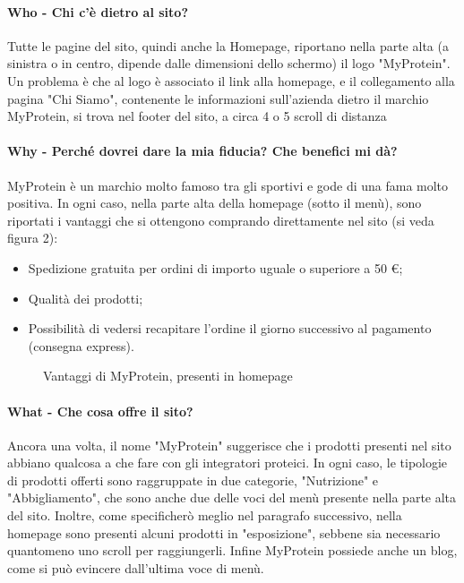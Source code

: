 \paragraph{Who - Chi c'è dietro al sito?}
Tutte le pagine del sito, quindi anche la Homepage, riportano nella parte alta (a sinistra o in centro, dipende dalle dimensioni dello schermo) il logo "MyProtein". Un problema è che al logo è associato il link alla homepage, e il collegamento alla pagina "Chi Siamo", contenente le informazioni sull'azienda dietro il marchio MyProtein, si trova nel footer del sito, a circa 4 o 5 scroll di distanza

\paragraph{Why - Perché dovrei dare la mia fiducia? Che benefici mi dà?}
MyProtein è un marchio molto famoso tra gli sportivi e gode di una fama molto positiva. In ogni caso, nella parte alta della homepage (sotto il menù), sono riportati i vantaggi che si ottengono comprando direttamente nel sito (si veda figura 2):
\begin{itemize}
	\item Spedizione gratuita per ordini di importo uguale o superiore a 50 \euro;
	\item Qualità dei prodotti;
	\item Possibilità di vedersi recapitare l'ordine il giorno successivo al pagamento (consegna express).
\end{itemize}
\begin{figure}[!htb]
	\caption{\label{fig:figura2} Vantaggi di MyProtein, presenti in homepage}
\end{figure}
\paragraph{What - Che cosa offre il sito?}
Ancora una volta, il nome "MyProtein" suggerisce che i prodotti presenti nel sito abbiano qualcosa a che fare con gli integratori proteici. In ogni caso, le tipologie di prodotti offerti sono raggruppate in due categorie, "Nutrizione" e "Abbigliamento", che sono anche due delle voci del menù presente nella parte alta del sito. Inoltre, come specificherò meglio nel paragrafo successivo, nella homepage sono presenti alcuni prodotti in "esposizione", sebbene sia necessario quantomeno uno scroll per raggiungerli. Infine MyProtein possiede anche un blog, come si può evincere dall'ultima voce di menù.
